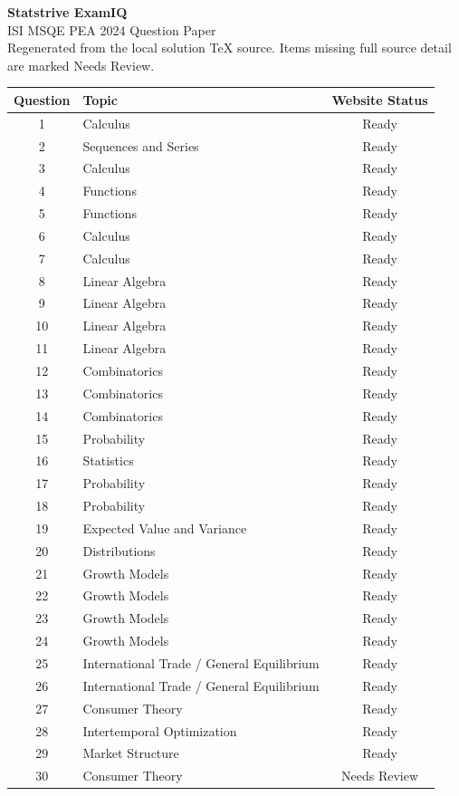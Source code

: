 \documentclass[11pt]{article}
\begin{document}
\begin{center}
{\Huge \textbf{Statstrive ExamIQ}}\\[6pt]
{\Large ISI MSQE PEA 2024 Question Paper}\\[4pt]
{\small Regenerated from the local solution TeX source. Items missing full source detail are marked Needs Review.}
\end{center}

\vspace{0.5cm}
\begin{longtable}{c l c}
\toprule
Question & Topic & Website Status \\
\midrule
\endhead
1 & Calculus & Ready \\
2 & Sequences and Series & Ready \\
3 & Calculus & Ready \\
4 & Functions & Ready \\
5 & Functions & Ready \\
6 & Calculus & Ready \\
7 & Calculus & Ready \\
8 & Linear Algebra & Ready \\
9 & Linear Algebra & Ready \\
10 & Linear Algebra & Ready \\
11 & Linear Algebra & Ready \\
12 & Combinatorics & Ready \\
13 & Combinatorics & Ready \\
14 & Combinatorics & Ready \\
15 & Probability & Ready \\
16 & Statistics & Ready \\
17 & Probability & Ready \\
18 & Probability & Ready \\
19 & Expected Value and Variance & Ready \\
20 & Distributions & Ready \\
21 & Growth Models & Ready \\
22 & Growth Models & Ready \\
23 & Growth Models & Ready \\
24 & Growth Models & Ready \\
25 & International Trade / General Equilibrium & Ready \\
26 & International Trade / General Equilibrium & Ready \\
27 & Consumer Theory & Ready \\
28 & Intertemporal Optimization & Ready \\
29 & Market Structure & Ready \\
30 & Consumer Theory & Needs Review \\
\bottomrule
\end{longtable}
\end{document}

